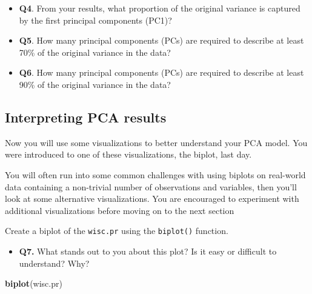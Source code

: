 \documentclass[]{article}
\newenvironment{Shaded}{\begin{snugshade}}{\end{snugshade}}
\newcommand{\KeywordTok}[1]{\textcolor[rgb]{0.13,0.29,0.53}{\textbf{#1}}}
\newcommand{\NormalTok}[1]{#1}
\providecommand{\tightlist}{%
  \setlength{\itemsep}{0pt}\setlength{\parskip}{0pt}}
\begin{document}
\begin{itemize}
\tightlist
\item
  \textbf{Q4}. From your results, what proportion of the original
  variance is captured by the first principal components (PC1)?\\
\item
  \textbf{Q5}. How many principal components (PCs) are required to
  describe at least 70\% of the original variance in the data?
\item
  \textbf{Q6}. How many principal components (PCs) are required to
  describe at least 90\% of the original variance in the data?
\end{itemize}

\subsection{Interpreting PCA results}\label{interpreting-pca-results}

Now you will use some visualizations to better understand your PCA
model. You were introduced to one of these visualizations, the biplot,
last day.

You will often run into some common challenges with using biplots on
real-world data containing a non-trivial number of observations and
variables, then you'll look at some alternative visualizations. You are
encouraged to experiment with additional visualizations before moving on
to the next section

Create a biplot of the \texttt{wisc.pr} using the \texttt{biplot()}
function.

\begin{itemize}
\tightlist
\item
  \textbf{Q7.} What stands out to you about this plot? Is it easy or
  difficult to understand? Why?
\end{itemize}

\begin{Shaded}
\begin{Highlighting}[]
\KeywordTok{biplot}\NormalTok{(wisc.pr)}
\end{Highlighting}
\end{Shaded}
\end{document}
